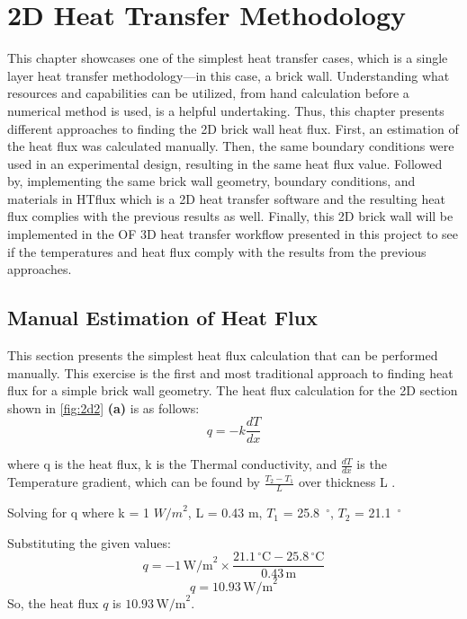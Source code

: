 
\chapter{2D Heat Transfer Methodology}

This chapter showcases one of the simplest heat transfer cases, which is a single layer  heat transfer methodology---in this case, a brick wall.
Understanding what resources and capabilities can be utilized, from hand calculation before a numerical method is used, is a helpful undertaking. 
Thus, this chapter presents different approaches to finding the 2D brick wall heat flux. First, an estimation of the heat flux was calculated manually. Then, the same boundary conditions were used in an experimental design, resulting in the same heat flux value. Followed by, implementing the same brick wall geometry, boundary conditions, and materials in HTflux which is a 2D heat transfer software and the resulting heat flux complies with the previous results as well. %
Finally, this 2D brick wall will be implemented in the \gls{OF} 3D heat transfer workflow presented in this project to see if the temperatures and heat flux comply with the results from the previous approaches. 




\section{Manual Estimation of Heat Flux}
This section presents the simplest heat flux calculation that can be performed manually. This exercise is the first and most traditional approach to finding heat flux for a simple brick wall geometry. The heat flux calculation for the 2D section shown in \ref{fig:2d2} \textbf{(a)} is as follows:
\begin{equation}
q = -k \frac{dT}{dx}
\end{equation}

where q is the heat flux,
k is the Thermal conductivity, and
$\frac{dT}{dx}$ is the Temperature gradient, which can be found by $\frac{T_2 - T_1}{L}$ over thickness L \cite{heattransfund}. 

Solving for q where k = 1 ${W/m}^2$, 
L = 0.43 m,
$T_1$ = 25.8\, $^\circ$, 
$T_2$  = 21.1\, $^\circ$



Substituting the given values:
\[ q = -1 \, \text{W/m}^2 \times \frac{21.1 \, ^\circ \text{C} - 25.8 \, ^\circ \text{C}}{0.43 \, \text{m}} \]
\[ q = 10.93 \, \text{W/m}^2 \]
So, the heat flux \( q \) is \( 10.93 \, \text{W/m}^2 \).





